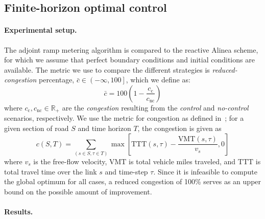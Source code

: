 														
														
							\subsection{Finite-horizon optimal control\label{sub:Finite-horizon-optimal-control}}
														
														
							\paragraph{Experimental setup.}
														
							The adjoint ramp metering algorithm is compared to the reactive Alinea
							scheme, for which we assume that perfect boundary conditions and initial conditions
							are available. The metric we use to compare the different strategies is \emph{reduced-congestion} percentage, $\bar{c} \in \left(-\infty,100\right]$, which we define as:
							\[
							\bar{c} = 100 \left(1 - \frac{c_\text{c}}{c_{\text{nc}}}\right)
							\]where $c_\text{c}, c_{\text{nc}} \in \mathbb{R}_+$ are the \emph{congestion} resulting from the \emph{control} and \emph{no-control} scenarios, respectively. We use the metric for congestion as defined in~\cite{Skabardonis2003}; for a given section of road $S$ and time horizon $T$, the congestion is given as
							\[
							c\left(S,T\right) = \sum_{\left(s\in S, \tau\in T\right)} \max \left[\text{TTT}\left(s,\tau\right) - \frac{\text{VMT}\left(s, \tau\right)}{v_s}, 0\right]
							\] where $v_s$ is the free-flow velocity, $\text{VMT}$ is total vehicle miles traveled, and $\text{TTT}$ is total travel time over the link $s$ and time-step $\tau$. Since it is infeasible to compute the global optimum for all cases, a reduced congestion of 100\% serves as an upper bound on the possible amount of improvement.

							\paragraph{Results.}
														

